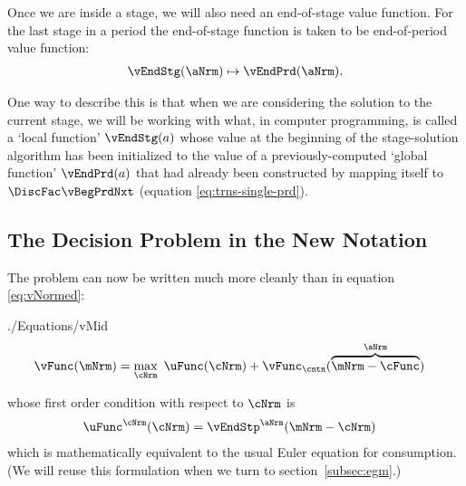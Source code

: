 \documentclass[\econtexRoot/SolvingMicroDSOPs]{subfiles}
\begin{document}
Once we are inside a {stage}, we will also need an end-of-{stage} value function.  For the last {stage} in a {period} the end-of-{stage} function is taken to be end-of-{period} value function:
  \begin{equation}\begin{gathered}\begin{aligned}
        \vEndStg(\aNrm) \mapsto \vEndPrd(\aNrm).
      \end{aligned}\end{gathered}\end{equation}

One way to describe this is that when we are considering the solution to the current {stage}, we will be working with what, in computer programming, is called a `local function' $\vEndStg(a)$ whose value at the beginning of the {stage}-solution algorithm has been initialized to the value of a previously-computed `global function' $\vEndPrd(a)$ that had already been constructed by mapping itself to $\DiscFac \vBegPrdNxt$ (equation \eqref{eq:trns-single-prd}).
\hypertarget{decision-problem}{}

\subsection{The Decision Problem in the New Notation}\label{subsec:decision-problem}

The {\Decision} problem can now be written much more cleanly than in equation \eqref{eq:vNormed}:
\begin{verbatimwrite}{./Equations/vMid}
  \begin{equation}\begin{gathered}\begin{aligned}
        \vFunc(\mNrm) & = \max_{\cNrm}~ \uFunc({\cNrm}) + \vFunc_{\cntn}(\overbrace{\mNrm-\cFunc}^{\aNrm}) \label{eq:vMid}
      \end{aligned}\end{gathered}\end{equation}
\end{verbatimwrite}
\unskip
whose first order condition with respect to $\cNrm$ is
\begin{equation}\begin{gathered}\begin{aligned}
  \uFunc^{\cNrm}(\cNrm) &= \vEndStp^{\aNrm}(\mNrm-\cNrm)  \label{eq:upEqbetaOp} 
\end{aligned}\end{gathered}\end{equation}
which is mathematically equivalent to the usual Euler equation for consumption.  (We will reuse this formulation when we turn to section~\ref{subsec:egm}.)
\end{document}
